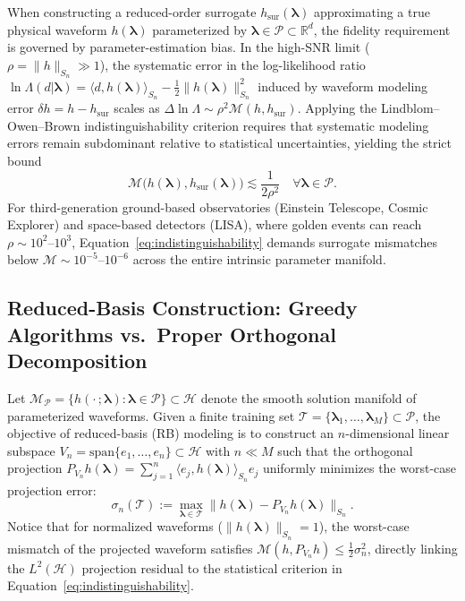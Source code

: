 \documentclass[11pt, a4paper]{article}
\begin{document}
When constructing a reduced-order surrogate $h_{\mathrm{sur}}(\boldsymbol{\lambda})$ approximating a true physical waveform $h(\boldsymbol{\lambda})$ parameterized by $\boldsymbol{\lambda} \in \mathcal{P} \subset \mathbb{R}^d$, the fidelity requirement is governed by parameter-estimation bias. In the high-SNR limit ($\rho = \|h\|_{S_n} \gg 1$), the systematic error in the log-likelihood ratio $\ln \Lambda(d|\boldsymbol{\lambda}) = \langle d, h(\boldsymbol{\lambda}) \rangle_{S_n} - \frac{1}{2}\|h(\boldsymbol{\lambda})\|_{S_n}^2$ induced by waveform modeling error $\delta h = h - h_{\mathrm{sur}}$ scales as $\Delta \ln \Lambda \sim \rho^2 \mathcal{M}(h, h_{\mathrm{sur}})$. Applying the Lindblom--Owen--Brown indistinguishability criterion \cite{Lindblom2008} requires that systematic modeling errors remain subdominant relative to statistical uncertainties, yielding the strict bound
\begin{equation}
\mathcal{M}\bigl(h(\boldsymbol{\lambda}), h_{\mathrm{sur}}(\boldsymbol{\lambda})\bigr) \lesssim \frac{1}{2\rho^2} \quad \forall \boldsymbol{\lambda} \in \mathcal{P} .
\label{eq:indistinguishability}
\end{equation}
For third-generation ground-based observatories (Einstein Telescope, Cosmic Explorer) and space-based detectors (LISA), where golden events can reach $\rho \sim 10^2$--$10^3$, Equation~\eqref{eq:indistinguishability} demands surrogate mismatches below $\mathcal{M} \sim 10^{-5}$--$10^{-6}$ across the entire intrinsic parameter manifold.

\subsection{Reduced-Basis Construction: Greedy Algorithms vs.\ Proper Orthogonal Decomposition}

Let $\mathcal{M}_{\mathcal{P}} = \{ h(\cdot\,; \boldsymbol{\lambda}) : \boldsymbol{\lambda} \in \mathcal{P} \} \subset \mathcal{H}$ denote the smooth solution manifold of parameterized waveforms. Given a finite training set $\mathcal{T} = \{\boldsymbol{\lambda}_1, \dots, \boldsymbol{\lambda}_M\} \subset \mathcal{P}$, the objective of reduced-basis (RB) modeling is to construct an $n$-dimensional linear subspace $V_n = \mathrm{span}\{e_1, \dots, e_n\} \subset \mathcal{H}$ with $n \ll M$ such that the orthogonal projection $P_{V_n} h(\boldsymbol{\lambda}) = \sum_{j=1}^n \langle e_j, h(\boldsymbol{\lambda}) \rangle_{S_n} e_j$ uniformly minimizes the worst-case projection error:
\begin{equation}
\sigma_n(\mathcal{T}) := \max_{\boldsymbol{\lambda} \in \mathcal{T}} \bigl\| h(\boldsymbol{\lambda}) - P_{V_n} h(\boldsymbol{\lambda}) \bigr\|_{S_n} .
\label{eq:greedy_error}
\end{equation}
Notice that for normalized waveforms ($\|h(\boldsymbol{\lambda})\|_{S_n} = 1$), the worst-case mismatch of the projected waveform satisfies $\mathcal{M}(h, P_{V_n}h) \le \frac{1}{2}\sigma_n^2$, directly linking the $L^2(\mathcal{H})$ projection residual to the statistical criterion in Equation~\eqref{eq:indistinguishability}.
\end{document}
